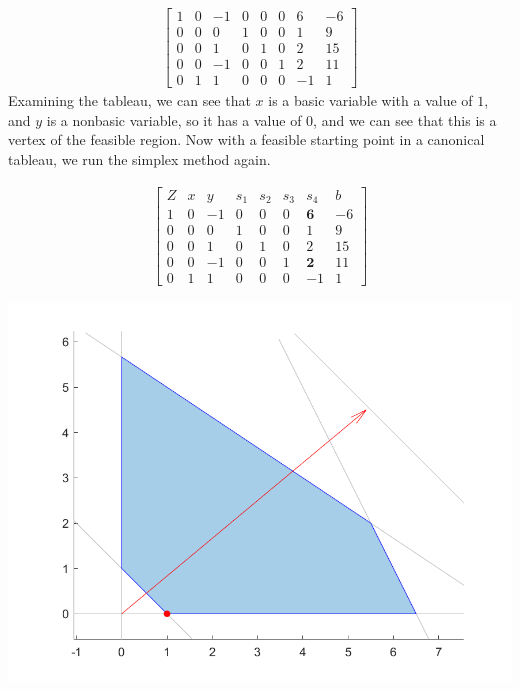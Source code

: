 \documentclass[10pt]{article}
\newenvironment{answerblock}[1]{\tcolorbox[beamer,noparskip,breakable,title={#1}]}{\endtcolorbox}
\begin{document}
\begin{answerblock}{Linear Programming Example Evaluation}
\begin{align*}
\begin{bmatrix}
	1	& 0		& -1	& 0		& 0		& 0		& 6		& -6 \\
	0	& 0		& 0		& 1		& 0		& 0		& 1		& 9 \\
	0	& 0		& 1		& 0		& 1		& 0		& 2		& 15 \\
	0	& 0		& -1	& 0		& 0		& 1		& 2		& 11 \\
	0	& 1		& 1		& 0		& 0		& 0		& -1	& 1
	\end{bmatrix}
	\end{align*}
	Examining the tableau, we can see that $x$ is a basic variable with a value of $1$, and $y$ is a nonbasic variable, so it has a value of 0, and we can see that this is a vertex of the feasible region.
	Now with a feasible starting point in a canonical tableau, we run the simplex method again.
	\begin{minipage}{0.6\textwidth}
		\begin{align*}
		\begin{bmatrix}
		Z	& x		& y		& s_1	& s_2	& s_3	& s_4	& b \\
		1	& 0		& -1	& 0		& 0		& 0		& \textbf{6}		& -6 \\
		0	& 0		& 0		& 1		& 0		& 0		& 1		& 9 \\
		0	& 0		& 1		& 0		& 1		& 0		& 2		& 15 \\
		0	& 0		& -1	& 0		& 0		& 1		& \textbf{2}		& 11 \\
		0	& 1		& 1		& 0		& 0		& 0		& -1	& 1
		\end{bmatrix}
		\end{align*}
	\end{minipage} \hfill
	\begin{minipage}{0.35\textwidth}
		\includegraphics[width = \textwidth]{images/paper_simplex_point_1.png}
	\end{minipage}


\end{answerblock}
\end{document}
